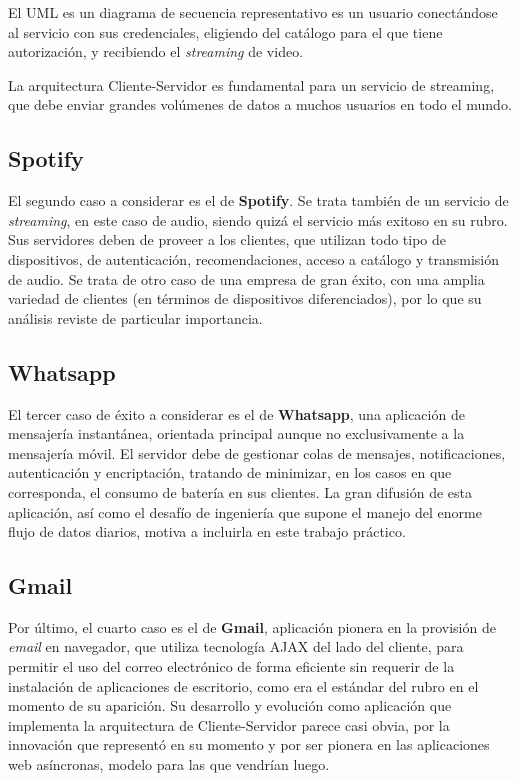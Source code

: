 \documentclass[
  spanish,
  11pt,
]{article}
\begin{document}
El UML es un diagrama de secuencia representativo es un usuario
conectándose al servicio con sus credenciales, eligiendo del catálogo
para el que tiene autorización, y recibiendo el \emph{streaming} de
video.



La arquitectura Cliente-Servidor es fundamental para un servicio de
streaming, que debe enviar grandes volúmenes de datos a muchos usuarios
en todo el mundo.

\subsection{Spotify}\label{spotify}

El segundo caso a considerar es el de \textbf{Spotify}. Se trata también
de un servicio de \emph{streaming}, en este caso de audio, siendo quizá
el servicio más exitoso en su rubro. Sus servidores deben de proveer a
los clientes, que utilizan todo tipo de dispositivos, de autenticación,
recomendaciones, acceso a catálogo y transmisión de audio. Se trata de
otro caso de una empresa de gran éxito, con una amplia variedad de
clientes (en términos de dispositivos diferenciados), por lo que su
análisis reviste de particular importancia.

\subsection{Whatsapp}\label{whatsapp}

El tercer caso de éxito a considerar es el de \textbf{Whatsapp}, una
aplicación de mensajería instantánea, orientada principal aunque no
exclusivamente a la mensajería móvil. El servidor debe de gestionar
colas de mensajes, notificaciones, autenticación y encriptación,
tratando de minimizar, en los casos en que corresponda, el consumo de
batería en sus clientes. La gran difusión de esta aplicación, así como
el desafío de ingeniería que supone el manejo del enorme flujo de datos
diarios, motiva a incluirla en este trabajo práctico.

\subsection{Gmail}\label{gmail}

Por último, el cuarto caso es el de \textbf{Gmail}, aplicación pionera
en la provisión de \emph{email} en navegador, que utiliza tecnología
AJAX del lado del cliente, para permitir el uso del correo electrónico
de forma eficiente sin requerir de la instalación de aplicaciones de
escritorio, como era el estándar del rubro en el momento de su
aparición. Su desarrollo y evolución como aplicación que implementa la
arquitectura de Cliente-Servidor parece casi obvia, por la innovación
que representó en su momento y por ser pionera en las aplicaciones web
asíncronas, modelo para las que vendrían luego.
\end{document}
